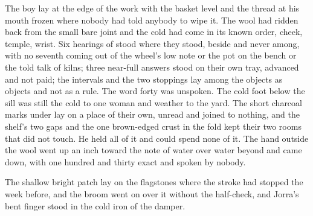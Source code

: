 The boy lay at the edge of the work with the basket level and the thread at his mouth frozen where nobody had told anybody to wipe it. The wool had ridden back from the small bare joint and the cold had come in its known order, cheek, temple, wrist. Six hearings of  stood where they stood, beside and never among, with no seventh coming out of the wheel's low note or the pot on the bench or the told talk of kilns; three near-full answers stood on their own tray, advanced and not paid; the intervals and the two stoppings lay among the objects as objects and not as a rule. The word forty was unspoken. The cold foot below the sill was still the cold to one woman and weather to the yard. The short charcoal marks under  lay on a place of their own, unread and joined to nothing, and the shelf's two gaps and the one brown-edged crust in the fold kept their two rooms that did not touch. He held all of it and could spend none of it. The hand outside the wool went up an inch toward the note of water over water beyond  and came down, with one hundred and thirty exact and spoken by nobody.

The shallow bright patch lay on the flagstones where the stroke had stopped the week before, and the broom went on over it without the half-check, and Jorra's bent finger stood in the cold iron of the damper.
